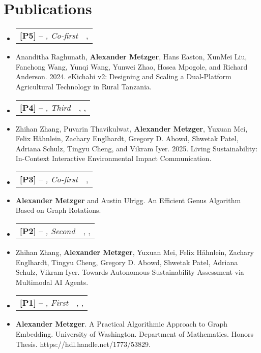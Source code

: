 \documentclass[letterpaper,11pt]{article}
\makeatletter
\newcommand{\resumeTopItem}[4]{
    \vspace{-1pt}\item[]
    \begin{tabular*}{0.97\textwidth}{l@{\extracolsep{\fill}}r}
        \textbf{#1} -- \textit{#2} & #3 \\
    \end{tabular*}\vspace{-5pt}
    \item[]{\small{#4}}\vspace{-2pt}
}
\newcommand{\resumeSubHeadingListStart}{\begin{itemize}[leftmargin=*]}
\newcommand{\resumeSubHeadingListEnd}{\end{itemize}}
\makeatother
\begin{document}
\section{Publications}
\resumeSubHeadingListStart
\resumeTopItem{[P5]}{\href{https://doi.org/10.1145/3613904.3642099}{\dotuline{ACM SIGCHI}}, Co-first}{\underbar{HCI}, \underbar{ICTD}}{
    Ananditha Raghunath, \textbf{Alexander Metzger}, Hans Easton, XunMei Liu, Fanchong Wang, Yunqi Wang, Yunwei Zhao, Hosea Mpogole, and Richard Anderson. 2024. eKichabi v2: Designing and Scaling a Dual-Platform Agricultural Technology in Rural Tanzania.
}
\resumeTopItem{[P4]}{\href{https://dl.acm.org/doi/10.1145/3749488}{\dotuline{ACM IMWUT}}, Third}{\underbar{ML for Sustainability}, \underbar{CV}, \underbar{HCI}}{
    Zhihan Zhang, Puvarin Thavikulwat, \textbf{Alexander Metzger}, Yuxuan Mei, Felix Hähnlein, Zachary Englhardt, Gregory D. Abowd, Shwetak Patel, Adriana Schulz, Tingyu Cheng, and Vikram Iyer. 2025. Living Sustainability: In-Context Interactive Environmental Impact Communication.
}
\resumeTopItem{[P3]}{\href{https://arxiv.org/abs/2411.07347}{\dotuline{Pre-print}}, Co-first}{\underbar{Algorithms}, \underbar{Graph Combinatorics}}{
    \textbf{Alexander Metzger} and Austin Ulrigg. An Efficient Genus Algorithm Based on Graph Rotations.
}
\resumeTopItem{[P2]}{\href{https://arxiv.org/abs/2507.17012}{\dotuline{Pre-print}}, Second}{\underbar{ML for Sustainability}, \underbar{CV}, \underbar{Agents}}{
    Zhihan Zhang, \textbf{Alexander Metzger}, Yuxuan Mei, Felix Hähnlein, Zachary Englhardt, Tingyu Cheng, Gregory D. Abowd, Shwetak Patel, Adriana Schulz, Vikram Iyer. Towards Autonomous Sustainability Assessment via Multimodal AI Agents.
}
\resumeTopItem{[P1]}{\href{https://hdl.handle.net/1773/53829}{\dotuline{University of Washington Student Research Paper}}, First}{\underbar{Topology}, \underbar{Graph Theory}, \underbar{Algorithms}}{
    \textbf{Alexander Metzger}. A Practical Algorithmic Approach to Graph Embedding. University of Washington. Department of Mathematics. Honors Thesis. https://hdl.handle.net/1773/53829.
}
\resumeSubHeadingListEnd

\end{document}
